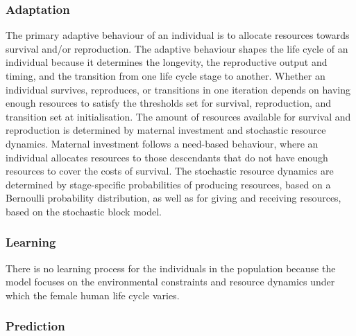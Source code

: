 \documentclass{article}
\begin{document}
\subsubsection{Adaptation}

The primary adaptive behaviour of an individual is to allocate resources towards survival and/or reproduction. The adaptive behaviour shapes the life cycle of an individual because it determines the longevity, the reproductive output and timing, and the transition from one life cycle stage to another. Whether an individual survives, reproduces, or transitions in one iteration depends on having enough resources to satisfy the thresholds set for survival, reproduction, and transition set at initialisation. The amount of resources available for survival and reproduction is determined by maternal investment and stochastic resource dynamics. Maternal investment follows a need-based behaviour, where an individual allocates resources to those descendants that do not have enough resources to cover the costs of survival. The stochastic resource dynamics are determined by stage-specific probabilities of producing resources, based on a Bernoulli probability distribution, as well as for giving and receiving resources, based on the stochastic block model. 

\subsubsection{Learning}

There is no learning process for the individuals in the population because the model focuses on the environmental constraints and resource dynamics under which the female human life cycle varies.

\subsubsection{Prediction}
\end{document}
